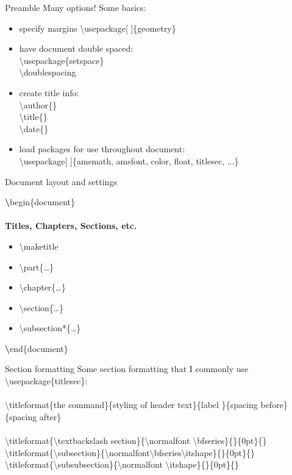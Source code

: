 \documentclass[xcolor=dvipsnames]{beamer}
\begin{document}
\begin{frame}{\LARGE{Preamble}}
Many options! Some basics:
\begin{itemize}
\item specify margins {\color{red}\textbackslash usepackage}[ ]\{{\color{OliveGreen}geometry}\}
\item have document double spaced:\\ {\color{red}\textbackslash usepackage}\{{\color{OliveGreen}setspace}\}\\{\color{red}\textbackslash doublespacing}
\item create title info:\\
{\color{red}\textbackslash author}\{\}\\
{\color{red}\textbackslash title}\{\}\\
{\color{red}\textbackslash date}\{\}
\item load packages for use throughout document:\\
{\color{red}\textbackslash usepackage}[ ]\{{\color{OliveGreen}amsmath, amsfont, color, float, titlesec, ...}\}
\end{itemize}
\end{frame}

\begin{frame}{\LARGE{Document layout and settings}}

{\color{ProcessBlue}\textbf\textbackslash begin\{}{\color{blue}document}{\color{ProcessBlue}\}}\\~\\
\textbf{Titles, Chapters, Sections, etc.}
\begin{itemize}
\normalsize
\item \textbackslash maketitle
\item \textbackslash part\{\dots\}
\item \textbackslash chapter\{\dots\}
\item \textbackslash section\{\dots\}
\item \textbackslash subsection*\{\dots\}
\end{itemize}
{\color{ProcessBlue}\textbf\textbackslash end\{}{\color{blue}document}{\color{ProcessBlue}\}}
\end{frame}

\begin{frame}{Section formatting}
Some section formatting that I commonly use \textbackslash usepackage\{titlesec\}:\\~\\
\textbackslash titleformat\{the command\}\{styling of header text\}\{label \}\{spacing before\}\{spacing after\} \\~\\

\textbackslash titleformat\{\textbackslash textbackslash section\}\{\textbackslash normalfont \textbackslash bfseries\}\{\}\{0pt\}\{\}
\textbackslash titleformat\{\textbackslash subsection\}\{\textbackslash normalfont\textbackslash bfseries\textbackslash itshape\}\{\}\{0pt\}\{\}
\textbackslash titleformat\{\textbackslash subsubsection\}\{\textbackslash normalfont \textbackslash itshape\}\{\}\{0pt\}\{\}

\end{frame}
\end{document}
